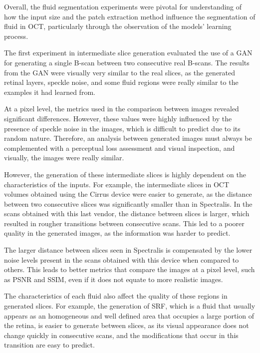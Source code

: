 \par
Overall, the fluid segmentation experiments were pivotal for understanding of how the input size and the patch extraction method influence the segmentation of fluid in OCT, particularly through the observation of the models' learning process. 
\par
The first experiment in intermediate slice generation evaluated the use of a GAN for generating a single B-scan between two consecutive real B-scans. The results from the GAN were visually very similar to the real slices, as the generated retinal layers, speckle noise, and some fluid regions were really similar to the examples it had learned from.
\par
At a pixel level, the metrics used in the comparison between images revealed significant differences. However, these values were highly influenced by the presence of speckle noise in the images, which is difficult to predict due to its random nature. Therefore, an analysis between generated images must always be complemented with a perceptual loss assessment and visual inspection, and visually, the images were really similar.
\par
However, the generation of these intermediate slices is highly dependent on the characteristics of the inputs. For example, the intermediate slices in OCT volumes obtained using the Cirrus device were easier to generate, as the distance between two consecutive slices was significantly smaller than in Spectralis. In the scans obtained with this last vendor, the distance between slices is larger, which resulted in rougher transitions between consecutive scans. This led to a poorer quality in the generated images, as the information was harder to predict.
\par
The larger distance between slices seen in Spectralis is compensated by the lower noise levels present in the scans obtained with this device when compared to others. This leads to better metrics that compare the images at a pixel level, such as PSNR and SSIM, even if it does not equate to more realistic images.
\par
The characteristics of each fluid also affect the quality of these regions in generated slices. For example, the generation of SRF, which is a fluid that usually appears as an homogeneous and well defined area that occupies a large portion of the retina, is easier to generate between slices, as its visual appearance does not change quickly in consecutive scans, and the modifications that occur in this transition are easy to predict.
